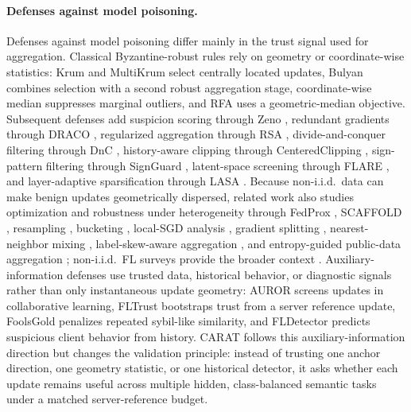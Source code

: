 \documentclass{article}
\begin{document}
\paragraph{Defenses against model poisoning.}
Defenses against model poisoning differ mainly in the trust signal used for aggregation. Classical Byzantine-robust rules rely on geometry or coordinate-wise statistics: Krum and MultiKrum \citep{blanchard2017krum} select centrally located updates, Bulyan \citep{elmhamdi2018bulyan} combines selection with a second robust aggregation stage, coordinate-wise median \citep{yin2018median} suppresses marginal outliers, and RFA \citep{pillutla2022rfa} uses a geometric-median objective. Subsequent defenses add suspicion scoring through Zeno \citep{xie2019zeno}, redundant gradients through DRACO \citep{chen2018draco}, regularized aggregation through RSA \citep{li2019rsa}, divide-and-conquer filtering through DnC \citep{shejwalkar2021manipulating}, history-aware clipping through CenteredClipping \citep{karimireddy2021history}, sign-pattern filtering through SignGuard \citep{xu2022signguard}, latent-space screening through FLARE \citep{wang2022flare}, and layer-adaptive sparsification through LASA \citep{xu2025lasa}. Because non-i.i.d.\ data can make benign updates geometrically dispersed, related work also studies optimization and robustness under heterogeneity through FedProx \citep{li2020fedprox}, SCAFFOLD \citep{karimireddy2020scaffold}, resampling \citep{he2021resampling}, bucketing \citep{karimireddy2022bucketing}, local-SGD analysis \citep{data2021localsgd}, gradient splitting \citep{liu2023gas}, nearest-neighbor mixing \citep{allouah2023fixing}, label-skew-aware aggregation \citep{bao2024boba}, and entropy-guided public-data aggregation \citep{huang2024sdea}; non-i.i.d.\ FL surveys provide the broader context \citep{zhu2021noniidsurvey}. Auxiliary-information defenses use trusted data, historical behavior, or diagnostic signals rather than only instantaneous update geometry: AUROR \citep{shen2016auror} screens updates in collaborative learning, FLTrust \citep{cao2021fltrust} bootstraps trust from a server reference update, FoolsGold \citep{fung2020foolsgold} penalizes repeated sybil-like similarity, and FLDetector \citep{zhang2022fldetector} predicts suspicious client behavior from history. CARAT follows this auxiliary-information direction but changes the validation principle: instead of trusting one anchor direction, one geometry statistic, or one historical detector, it asks whether each update remains useful across multiple hidden, class-balanced semantic tasks under a matched server-reference budget.
\end{document}
